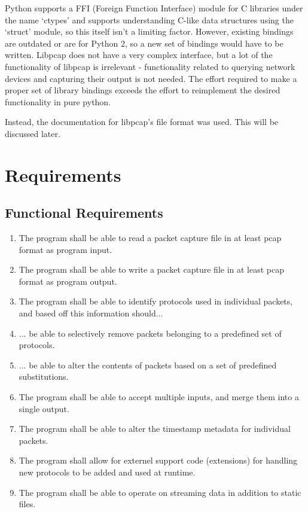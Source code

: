 \documentclass[10pt,a4paper,notitlepage]{report}
\begin{document}
Python supports a FFI (Foreign Function Interface) module for C libraries under the name `ctypes' and supports understanding C-like data structures using the `struct' module, so this itself isn't a limiting factor.
However, existing bindings are outdated or are for Python 2, so a new set of bindings would have to be written. Libpcap does not have a very complex interface, but a lot of the functionality of libpcap is irrelevant - functionality related to querying network devices and capturing their output is not needed. The effort required to make a proper set of library bindings exceeds the effort to reimplement the desired functionality in pure python.

Instead, the documentation for libpcap's file format was used. This will be discussed later.


\chapter{Requirements}
\section{Functional Requirements}

\begin{enumerate}[label=\bfseries FR\arabic*:]
\item \label{fr:1} The program shall be able to read a packet capture file in at least pcap format as program input.
\item \label{fr:2} The program shall be able to write a packet capture file in at least pcap format as program output.
\item \label{fr:3} The program shall be able to identify protocols used in individual packets, and based off this information should...
\item \label{fr:4} ... be able to selectively remove packets belonging to a predefined set of protocols.
\item \label{fr:5} ... be able to alter the contents of packets based on a set of predefined substitutions.
\item \label{fr:6} The program shall be able to accept multiple inputs, and merge them into a single output.
\item \label{fr:7} The program shall be able to alter the timestamp metadata for individual packets.
\item \label{fr:8} The program shall allow for externel support code (extensions) for handling new protocols to be added and used at runtime.
\item \label{fr:9} The program shall be able to operate on streaming data in addition to static files.
\end{enumerate}
\end{document}
